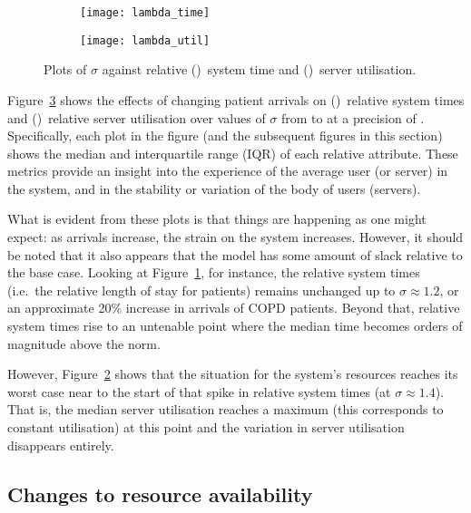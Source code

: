\begin{figure}
    \centering
    \begin{subfigure}{.5\imgwidth}
        \texttt{[image: lambda\_time]}
        \caption{}\label{fig:lambda_time}
    \end{subfigure}\hfill%
    \begin{subfigure}{.5\imgwidth}
        \texttt{[image: lambda\_util]}
        \caption{}\label{fig:lambda_util}
    \end{subfigure}
    \caption{%
        Plots of \(\sigma\) against relative ()~system
        time and ()~server utilisation.
    }\label{fig:lambda}
\end{figure}

Figure~\ref{fig:lambda} shows the effects of changing patient arrivals on
()~relative system times and
()~relative server utilisation over values of \(\sigma\)
from  to  at a
precision of . Specifically, each plot in the
figure (and the subsequent figures in this section) shows the median and
interquartile range (IQR) of each relative attribute. These metrics provide an
insight into the experience of the average user (or server) in the system, and
in the stability or variation of the body of users (servers).

What is evident from these plots is that things are happening as one might
expect: as arrivals increase, the strain on the system increases. However, it
should be noted that it also appears that the model has some amount of slack
relative to the base case. Looking at Figure~\ref{fig:lambda_time}, for
instance, the relative system times (i.e.\ the relative length of stay for
patients) remains unchanged up to \(\sigma \approx 1.2\), or an approximate 20\%
increase in arrivals of COPD patients. Beyond that, relative system times rise
to an untenable point where the median time becomes orders of magnitude above
the norm.

However, Figure~\ref{fig:lambda_util} shows that the situation for the system's
resources reaches its worst case near to the start of that spike in relative
system times (at \(\sigma \approx 1.4\)). That is, the median server utilisation
reaches a maximum (this corresponds to constant utilisation) at this point and
the variation in server utilisation disappears entirely.


\subsection{Changes to resource availability}\label{subsec:resources}

